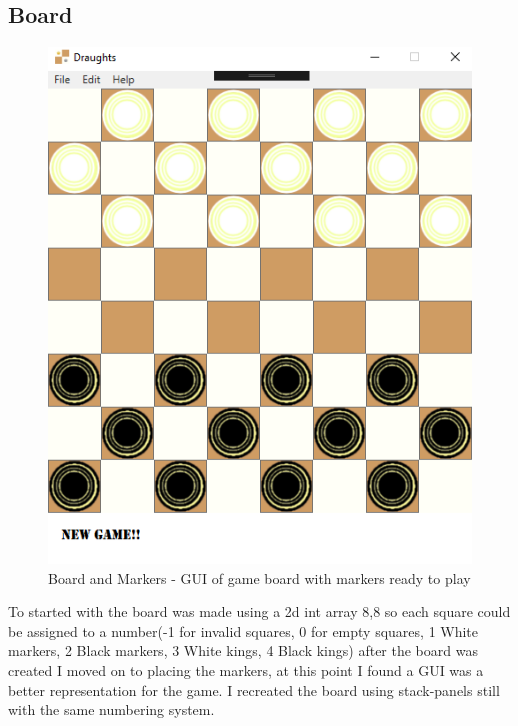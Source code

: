 \documentclass[10pt, a4paper]{article}
\begin{document}
	\subsection{Board}
	\begin{figure}[H]
  	
	\centering

  	\includegraphics[scale = 0.4]{board}
  	\caption{Board and Markers - GUI of game board with markers ready to play}
  	\label{fig:nonfloat}
	\end{figure}

	To started with the board was made using a 2d int array 8,8 so each square could be assigned to a number(-1 for invalid squares, 0 for empty squares, 1 White markers, 2 Black markers, 3 White kings, 4 Black kings) after the board was created I moved on to placing the markers, at this point I found a GUI was a better representation for the game. I recreated the board using stack-panels still with the same numbering system.
	
\end{document}
